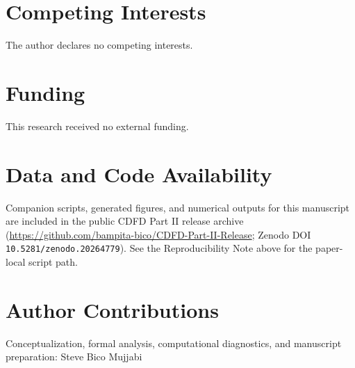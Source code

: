 \documentclass[11pt,a4paper]{article}
\begin{document}
\section*{Competing Interests}
The author declares no competing interests.

\section*{Funding}
This research received no external funding.

\section*{Data and Code Availability}
Companion scripts, generated figures, and numerical outputs for this manuscript are included in the public CDFD Part II release archive (\url{https://github.com/bampita-bico/CDFD-Part-II-Release}; Zenodo DOI \texttt{10.5281/zenodo.20264779}). See the Reproducibility Note above for the paper-local script path.

\section*{Author Contributions}
Conceptualization, formal analysis, computational diagnostics, and manuscript preparation: Steve Bico Mujjabi



\end{document}
